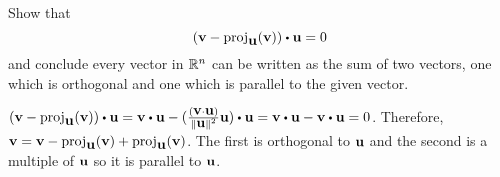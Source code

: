 \begin{enumialphparenastyle}
\begin{ex} Show that
  \begin{equation*}
    (\vect{v}-\proj_{\vect{u}
      }(\vect{v})) \dotprod \vect{u}=0
  \end{equation*}
  and conclude every vector in $\mathbb{R}^{n}$ can be written as the sum of
  two vectors, one which is orthogonal and one which is parallel to
  the given vector.
  \begin{sol}
    $(\vect{v}-\proj_{\vect{u}}(\vect{v})) \dotprod
    \vect{u} = \vect{v} \dotprod \vect{u}
    -(\frac{(\vect{v}\cdot\vect{u}) }{\norm{\vect{u}}
        ^{2}}\vect{u}) \dotprod \vect{u} = \vect{v} \dotprod \vect{u}
    - \vect{v} \dotprod \vect{u} =0$. Therefore,
    $\vect{v} = \vect{v} - \proj_{\vect{u}}(\vect{v}) +
    \proj_{\vect{u}}(\vect{v})$. The first is orthogonal to
    $\mbox{\bf u}$ and the second is a multiple of $\mbox{\bf u}$ so it is
    parallel to $\mbox{\bf u}$.
  \end{sol}
\end{ex}

\end{enumialphparenastyle}
